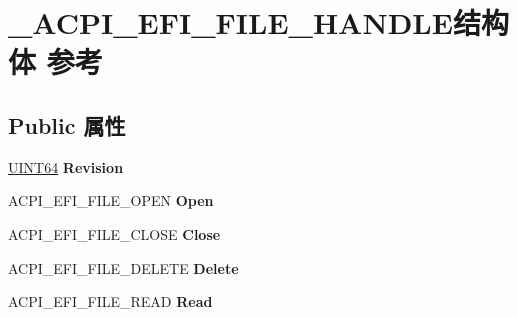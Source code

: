 \hypertarget{struct___a_c_p_i___e_f_i___f_i_l_e___h_a_n_d_l_e}{}\section{\+\_\+\+A\+C\+P\+I\+\_\+\+E\+F\+I\+\_\+\+F\+I\+L\+E\+\_\+\+H\+A\+N\+D\+L\+E结构体 参考}
\label{struct___a_c_p_i___e_f_i___f_i_l_e___h_a_n_d_l_e}
\subsection*{Public 属性}
\begin{DoxyCompactItemize}
\item 
\mbox{\label{struct___a_c_p_i___e_f_i___f_i_l_e___h_a_n_d_l_e_a3c78f4f63321f6c2765ef48130423bc5}} 
\hyperlink{_processor_bind_8h_a57be03562867144161c1bfee95ca8f7c}{U\+I\+N\+T64} {\bfseries Revision}
\item 
\mbox{\label{struct___a_c_p_i___e_f_i___f_i_l_e___h_a_n_d_l_e_abcb054e87581e79bf31d2009a4a92fe0}} 
A\+C\+P\+I\+\_\+\+E\+F\+I\+\_\+\+F\+I\+L\+E\+\_\+\+O\+P\+EN {\bfseries Open}
\item 
\mbox{\label{struct___a_c_p_i___e_f_i___f_i_l_e___h_a_n_d_l_e_a9766fad736ed450eae0df4e0cbf4b881}} 
A\+C\+P\+I\+\_\+\+E\+F\+I\+\_\+\+F\+I\+L\+E\+\_\+\+C\+L\+O\+SE {\bfseries Close}
\item 
\mbox{\label{struct___a_c_p_i___e_f_i___f_i_l_e___h_a_n_d_l_e_a908a1e20275fb1b3489ddb5b17ba30a7}} 
A\+C\+P\+I\+\_\+\+E\+F\+I\+\_\+\+F\+I\+L\+E\+\_\+\+D\+E\+L\+E\+TE {\bfseries Delete}
\item 
\mbox{\label{struct___a_c_p_i___e_f_i___f_i_l_e___h_a_n_d_l_e_ab36f2d61ea0d642103ae5e7a73b753a8}} 
A\+C\+P\+I\+\_\+\+E\+F\+I\+\_\+\+F\+I\+L\+E\+\_\+\+R\+E\+AD {\bfseries Read}
\item 
\mbox{\label{struct___a_c_p_i___e_f_i___f_i_l_e___h_a_n_d_l_e_afbd9b3b0ed917abd40fee1999e8998f3}} 

\end{DoxyCompactItemize}
